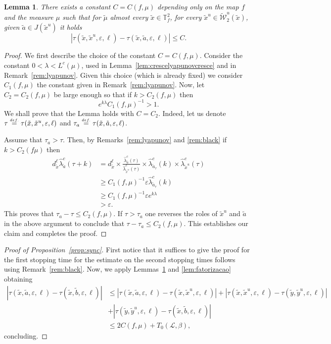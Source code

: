 \documentclass[a4paper,11pt,reqno]{amsart}
\newcommand{\TTf}{{\mathbb{T}_f^2}}
\newcommand{\cL}{{\mathcal L}}
\newcommand{\cW}{{\mathcal W}}
\newcommand{\eps}{\varepsilon}
\newcommand{\eqdef}{\stackrel{\scriptscriptstyle\textrm def.}{=}}
\newcommand{\tix}{\tilde{x}}
\newcommand{\ta}{\tilde{a}}
\newcommand{\tb}{\tilde{b}}
\newcommand{\tm}{\tilde{\mu}}
\newtheorem{lemma}[theorem]{Lemma}
\theoremstyle{definition}
\begin{document}
\begin{lemma}
	\label{lem:syncdynball}
There exists a constant $C=C(f,\mu)$ depending only on the map $f$ and the measure $\mu$ such that for $\tm$ almost every $\tix\in\TTf$, for every $\tix^u\in\widetilde{\cW}^u_2(\tix)$, given $\ta\in J(\tix^u)$ it holds
\[
\left|\tau(\tix,\tix^u,\eps,\ell)-\tau(\tix,\ta,\eps,\ell)\right|\leq C.
\]
\end{lemma}
\begin{proof}
We first describe the choice of the constant $C=C(f,\mu)$. Consider the constant $0<\lambda<L^c(\mu)$, used in Lemma~\ref{lem:crescelyapunovcresce} and in Remark~\ref{rem:lyapunov}. Given this choice (which is already fixed) we consider $C_1(f,\mu)$ the constant given in Remark~\ref{rem:lyapunov}. Now, let $C_2=C_2(f,\mu)$ be large enough so that if $k>C_2(f,\mu)$ then
\[
e^{k\lambda}C_1(f,\mu)^{-1}>1.
\]
We shall prove that the Lemma holds with $C=C_2$. Indeed, let us denote $\tau\eqdef\tau(\tix,\tix^u,\eps,\ell)$ and $\tau_a\eqdef\tau(\tix,\ta,\eps,\ell)$. 

Assume that $\tau_a>\tau$. Then, by Remarks~\ref{rem:lyapunov} and \ref{rem:black} if $k>C_2(f\mu)$ then 
\begin{align*}
	d^{\ell}_{\tix}\hat{\lambda}^c_{\ta}(\tau+k)&=d^{\ell}_{\tix}\times\frac{\hat{\lambda}^c_{\ta}(\tau)}{\hat{\lambda}^c_{\tix^u}(\tau)}\times\hat{\lambda}^c_{\ta_{\tau}}(k)\times\hat{\lambda}^c_{\tix^u}(\tau)\\
	&\geq C_1(f,\mu)^{-1}\eps\hat{\lambda}^c_{\ta_{\tau}}(k)\\
	&\geq C_1(f,\mu)^{-1}\eps e^{k\lambda}\\
	&>\eps.
\end{align*}
This proves that $\tau_a-\tau\leq C_2(f,\mu)$. If $\tau>\tau_a$ one reverses the roles of $\tix^u$ and $\ta$ in the above argument to conclude that $\tau-\tau_a\leq C_2(f,\mu)$. This establishes our claim and completes the proof.  
\end{proof}



\begin{proof}[Proof of Proposition~\ref{prop:sync}]
First notice that it suffices to give the proof for the first stopping time for the estimate on the second stopping times follows using Remark~\ref{rem:black}. Now, we apply Lemmas~\ref{lem:syncdynball} and \ref{lem:fatorizacao} obtaining
\begin{align*}
\left|\tau(\tix,\ta,\eps,\ell)-\tau(\tix,\tb,\eps,\ell)\right|&\leq\left|\tau(\tix,\ta,\eps,\ell)-\tau(\tix,\tix^u,\eps,\ell)\right|+\left|\tau(\tix,\tix^u,\eps,\ell)-\tau(\tilde{y},\tilde{y}^u,\eps,\ell)\right|\\
&+\left|\tau(\tilde{y},\tilde{y}^u,\eps,\ell)-\tau(\tix,\tb,\eps,\ell)\right|\\
&\leq 2C(f,\mu)+T_0(\cL,\beta),
\end{align*}
concluding.
 \end{proof}
\end{document}
